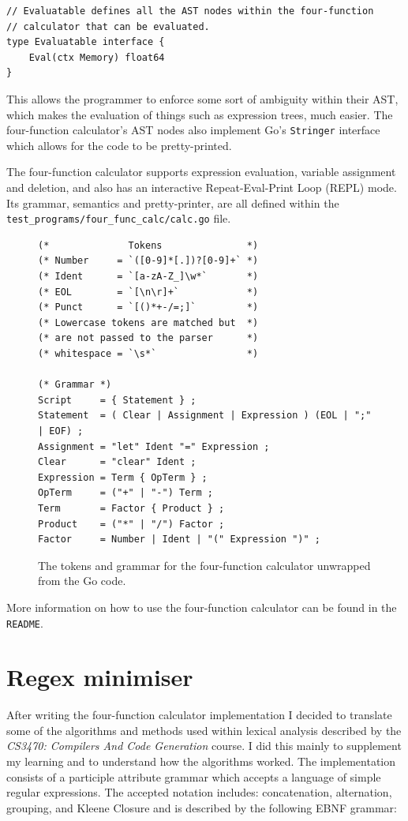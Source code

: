 \documentclass[]{full}
\theoremstyle{definition}
\begin{document}
\begin{verbatim}
// Evaluatable defines all the AST nodes within the four-function 
// calculator that can be evaluated.
type Evaluatable interface {
    Eval(ctx Memory) float64
}
\end{verbatim}

This allows the programmer to enforce some sort of ambiguity within their AST, which makes the evaluation of things such as expression trees, much easier. The four-function calculator's AST nodes also implement Go's \verb|Stringer| interface which allows for the code to be pretty-printed.

The four-function calculator supports expression evaluation, variable assignment and deletion, and also has an interactive Repeat-Eval-Print Loop (REPL) mode. Its grammar, semantics and pretty-printer, are all defined within the \verb|test_programs/four_func_calc/calc.go| file.

\begin{figure}[H]
    \begin{verbatim}
(*              Tokens               *)
(* Number     = `([0-9]*[.])?[0-9]+` *)
(* Ident      = `[a-zA-Z_]\w*`       *)
(* EOL        = `[\n\r]+`            *)
(* Punct      = `[()*+-/=;]`         *)
(* Lowercase tokens are matched but  *)
(* are not passed to the parser      *)
(* whitespace = `\s*`                *)

(* Grammar *)
Script     = { Statement } ;
Statement  = ( Clear | Assignment | Expression ) (EOL | ";" | EOF) ;
Assignment = "let" Ident "=" Expression ;
Clear      = "clear" Ident ;
Expression = Term { OpTerm } ;
OpTerm     = ("+" | "-") Term ;
Term       = Factor { Product } ;
Product    = ("*" | "/") Factor ;
Factor     = Number | Ident | "(" Expression ")" ;
    \end{verbatim}
    \cprotect\caption{The tokens and grammar for the four-function calculator unwrapped from the Go code.}
\end{figure}

More information on how to use the four-function calculator can be found in the \verb|README|.

\section{Regex minimiser}

After writing the four-function calculator implementation I decided to translate some of the algorithms and methods used within lexical analysis described by the \textit{CS3470: Compilers And Code Generation} course. I did this mainly to supplement my learning and to understand how the algorithms worked. The implementation consists of a participle attribute grammar which accepts a language of simple regular expressions. The accepted notation includes: concatenation, alternation, grouping, and Kleene Closure and is described by the following EBNF grammar:
\end{document}
